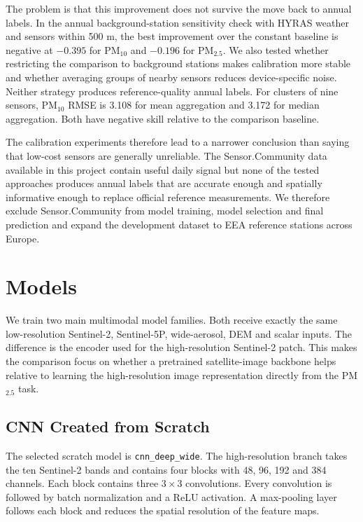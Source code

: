 \documentclass[english, a4paper]{article}
\begin{document}
The problem is that this improvement does not survive the move back to annual labels. In the annual background-station sensitivity check with HYRAS weather and sensors within 500 m, the best improvement over the constant baseline is negative at $-0.395$ for PM$_{10}$ and $-0.196$ for PM$_{2.5}$. We also tested whether restricting the comparison to background stations makes calibration more stable and whether averaging groups of nearby sensors reduces device-specific noise. Neither strategy produces reference-quality annual labels. For clusters of nine sensors, PM$_{10}$ RMSE is 3.108 for mean aggregation and 3.172 for median aggregation. Both have negative skill relative to the comparison baseline.

The calibration experiments therefore lead to a narrower conclusion than saying that low-cost sensors are generally unreliable. The Sensor.Community data available in this project contain useful daily signal but none of the tested approaches produces annual labels that are accurate enough and spatially informative enough to replace official reference measurements. We therefore exclude Sensor.Community from model training, model selection and final prediction and expand the development dataset to EEA reference stations across Europe.


\section{Models}
\label{sec:models}

We train two main multimodal model families. Both receive exactly the same low-resolution Sentinel-2, Sentinel-5P, wide-aerosol, DEM and scalar inputs. The difference is the encoder used for the high-resolution Sentinel-2 patch. This makes the comparison focus on whether a pretrained satellite-image backbone helps relative to learning the high-resolution image representation directly from the PM$_{2.5}$ task.


\subsection{CNN Created from Scratch}
\label{sec:scratch_model}

The selected scratch model is \texttt{cnn\_deep\_wide}. The high-resolution branch takes the ten Sentinel-2 bands and contains four blocks with 48, 96, 192 and 384 channels. Each block contains three $3\times3$ convolutions. Every convolution is followed by batch normalization and a ReLU activation. A max-pooling layer follows each block and reduces the spatial resolution of the feature maps.
\end{document}

